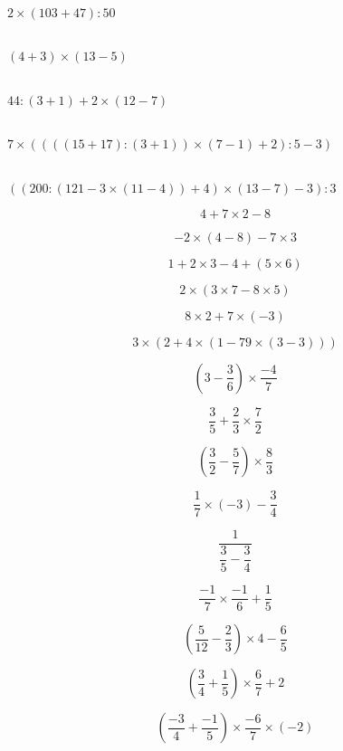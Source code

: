 \begin{multicols}{3}
  \\
  $2\times (103+47):50$

  \\
  $(4+3)\times (13-5)$

  \\
  $44:(3+1)+2\times (12-7)$
\end{multicols}

\begin{multicols}{2}
  \\
  $7\times ((((15+17):(3+1))\times (7-1)+2):5-3)$

  \\
  $((200:(121-3\times (11-4))+4)\times (13-7)-3):3$
\end{multicols}

\begin{multicols}{3}
    $$4+7\times 2 -8$$
      
    $$-2\times (4-8)-7\times 3$$
      
    $$1+2\times 3 -4+(5\times 6)$$
\end{multicols}

\begin{multicols}{3}
       
  $$2\times (3\times 7-8\times 5)$$
    
  $$8\times 2 +7 \times (-3)$$
    
    $$3\times (2+4\times (1-79\times (3-3)))$$
\end{multicols}

\begin{multicols}{3}
  $$(3-\dfrac{3}{6}) \times \dfrac{-4}{7} $$

  $$\dfrac{3}{5} + \dfrac{2}{3} \times \dfrac{7}{2}$$

  $$(\dfrac{3}{2} - \dfrac{5}{7}) \times \dfrac{8}{3}$$
\end{multicols}

\begin{multicols}{3}
  $$\dfrac{1}{7} \times(-3) - \dfrac{3}{4}$$
  
  $$\dfrac{1}{\dfrac{3}{5} - \dfrac{3}{4}}$$
    
  $$\dfrac{-1}{7} \times \dfrac{-1}{6} + \dfrac{1}{5}$$
\end{multicols}

\begin{multicols}{3}
  $$(\dfrac{5}{12} - \dfrac{2}{3})\times 4 - \dfrac{6}{5}$$
    
  $$(\dfrac{3}{4} + \dfrac{1}{5}) \times \dfrac{6}{7}+2$$
  
  $$(\dfrac{-3}{4} + \dfrac{-1}{5}) \times \dfrac{-6}{7}\times (-2)$$
\end{multicols}